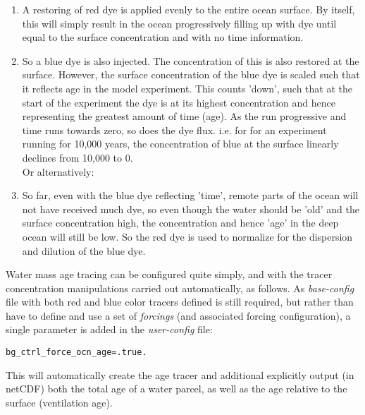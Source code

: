 \documentclass[11pt,fleqn]{book} %
\begin{document}
\begin{enumerate}
\setlength{\itemindent}{.2in}

\vspace{1mm}
\item A restoring of red dye is applied evenly to the entire ocean surface. By itself, this will simply result in the ocean progressively filling up with dye until equal to the surface concentration and with no time information.

\vspace{1mm}
\item So a blue dye is also injected. The concentration of this is also restored at the surface. However, the surface concentration of the blue dye is scaled such that it reflects age in the model experiment. This counts 'down', such that at the start of the experiment the dye is at its highest concentration and hence representing the greatest amount of time (age). As the run progressive and time runs towards zero, so does the dye flux. i.e. for for an experiment running for 10,000 years, the concentration of blue at the surface linearly declines from 10,000 to 0.
\\Or alternatively: 
 
\vspace{1mm}
\item So far, even with the blue dye reflecting 'time', remote parts of the ocean will not have received much dye, so even though the water should be 'old' and the surface concentration high, the concentration and hence 'age' in the deep ocean will still be low. So the red dye is used to normalize for the dispersion and dilution of the blue dye.

\end{enumerate}
\vspace{2mm}

Water mass age tracing can be configured quite simply, and with the tracer concentration manipulations carried out automatically, as follows. As \textit{base-config} file with both red and blue color tracers defined is still required, but  rather than have to define and use a set of \textit{forcings} (and associated forcing configuration), a single parameter is added in the \textit{user-config} file:
\vspace{-2pt}\begin{verbatim}
bg_ctrl_force_ocn_age=.true.
\end{verbatim}\vspace{-2pt}
This will automatically create the age tracer and additional explicitly output (in netCDF) both the total age of a water parcel, as well as the age relative to the surface (ventilation age).
\end{document}
